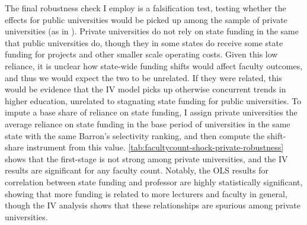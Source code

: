 The final robustness check I employ is a falsification test, testing whether the effects for public universities would be picked up among the sample of private universities (as in \citealt{NBERw27885}).
Private universities do not rely on state funding in the same that public universities do, though they in some states do receive some state funding for projects and other smaller scale operating costs.
Given this low reliance, it is unclear how state-wide funding shifts would affect faculty outcomes, and thus we would expect the two to be unrelated.
If they were related, this would be evidence that the IV model picks up otherwise concurrent trends in higher education, unrelated to stagnating state funding for public universities.
To impute a base share of reliance on state funding, I assign private universities the average reliance on state funding in the base period of universities in the same state with the same Barron's selectivity ranking, and then compute the shift-share instrument from this value.
\autoref{tab:facultycount-shock-private-robustness} shows that the first-stage is not strong among private universities, and the IV results are significant for any faculty count.
Notably, the OLS results for correlation between state funding and professor are highly statistically significant, showing that more funding is related to more lecturers and faculty in general, though the IV analysis shows that these relationships are spurious among private universities.
